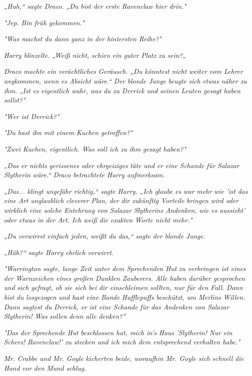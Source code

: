 {\emph{„Huh,“ sagte Draco. „Du bist der erste Ravenclaw hier drin."}

\emph{"Jep. Bin früh gekommen."}

\emph{"Was machst du dann ganz in der hintersten Reihe?"}

\emph{Harry blinzelte. „Weiß nicht, schien ein guter Platz zu sein?„}

\emph{Draco machte ein verächtliches Geräusch. „Du könntest nicht weiter vom Lehrer wegkommen, wenn es Absicht wäre.“ Der blonde Junge beugte sich etwas näher zu ihm. „Ist es eigentlich wahr, was du zu Derrick und seinen Leuten gesagt haben sollst?"}

\emph{"Wer ist Derrick?"}

\emph{"Du hast ihn mit einem Kuchen getroffen?"}

\emph{"Zwei Kuchen, eigentlich. Was soll ich zu ihm gesagt haben?"}

\emph{„Das er nichts gerissenes oder ehrgeiziges täte und er eine Schande für} \emph{Salazar Slytherin wäre.“ Draco betrachtete Harry aufmerksam.}

\emph{„Das... klingt ungefähr richtig,“ sagte Harry. „Ich glaube es war mehr wie 'ist das eine Art unglaublich cleverer Plan, der dir zukünftig Vorteile} \emph{bringen wird oder wirklich eine solche Entehrung von Salazar Slytherins Andenken, wie es aussieht' oder etwas in der Art. Ich weiß die exakten Worte nicht mehr."}

\emph{„Du verwirrst einfach jeden, weißt du das,“ sagte der blonde Junge.}

\emph{„Häh?“ sagte Harry ehrlich verwirrt.}

\emph{"Warrington sagte, lange Zeit unter dem Sprechenden Hut zu verbringen ist eines der Warnzeichen eines großen Dunklen Zauberers. Alle haben darüber gesprochen und sich gefragt, ob sie sich bei dir einschleimen sollten, nur für den Fall. Dann bist du losgezogen und hast eine Bande} \emph{\emph{Hufflepuffs}} \emph{beschützt, um Merlins Willen.} \emph{\emph{Dann}} \emph{sagtest du Derrick, er ist eine Schande für das Andenken von Salazar Slytherin! Was} \emph{\emph{sollen}} \emph{denn alle denken?"}

\emph{"Das der Sprechende Hut beschlossen hat, mich in's Haus 'Slytherin! Nur ein Scherz! Ravenclaw!' zu stecken und ich mich dem entsprechend verhalten habe."}

\emph{Mr. Crabbe und Mr. Goyle kicherten beide, woraufhin Mr. Goyle sich schnell die Hand vor den Mund schlug.}

}
